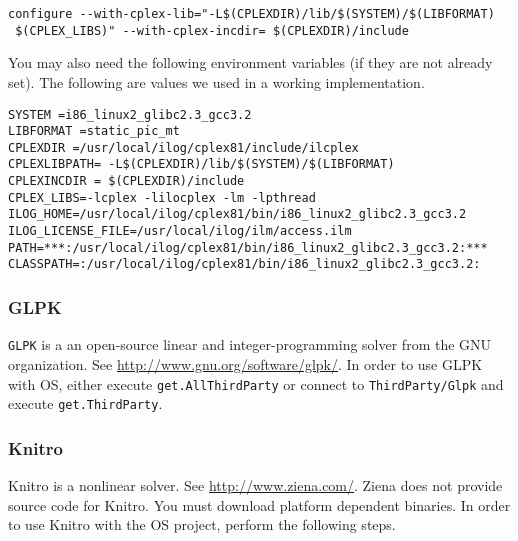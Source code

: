 \documentclass[11pt]{article}
\renewcommand{\_}{{\char"5F}}
\renewcommand{\{}{{\char"7B}}
\renewcommand{\}}{{\char"7D}}
\renewcommand{\^}{{\char"0D}}
\renewcommand{\'}{{\char"0D}}
\begin{document}
\begin{verbatim}
configure --with-cplex-lib="-L$(CPLEXDIR)/lib/$(SYSTEM)/$(LIBFORMAT)
 $(CPLEX_LIBS)" --with-cplex-incdir= $(CPLEXDIR)/include
\end{verbatim}

You may also need the following environment variables (if they are not already set). The following are values we used in a working implementation.
\begin{verbatim}
SYSTEM =i86_linux2_glibc2.3_gcc3.2
LIBFORMAT =static_pic_mt
CPLEXDIR =/usr/local/ilog/cplex81/include/ilcplex
CPLEXLIBPATH= -L$(CPLEXDIR)/lib/$(SYSTEM)/$(LIBFORMAT)
CPLEXINCDIR = $(CPLEXDIR)/include
CPLEX_LIBS=-lcplex -lilocplex -lm -lpthread
ILOG_HOME=/usr/local/ilog/cplex81/bin/i86_linux2_glibc2.3_gcc3.2
ILOG_LICENSE_FILE=/usr/local/ilog/ilm/access.ilm
PATH=***:/usr/local/ilog/cplex81/bin/i86_linux2_glibc2.3_gcc3.2:***
CLASSPATH=:/usr/local/ilog/cplex81/bin/i86_linux2_glibc2.3_gcc3.2:
\end{verbatim}

\subsubsection{GLPK}

{\tt GLPK} is a an open-source linear and integer-programming solver from the GNU organization. See \url{http://www.gnu.org/software/glpk/}.  In order to use GLPK with OS, either execute {\tt get.AllThirdParty} or connect to {\tt ThirdParty/Glpk} and execute {\tt get.ThirdParty}.










\subsubsection{Knitro}


Knitro is a nonlinear solver. See \url{http://www.ziena.com/}.  Ziena does not provide source code for Knitro.  You must download platform dependent binaries.   In order to use Knitro with the OS project, perform the following steps.
\end{document}
